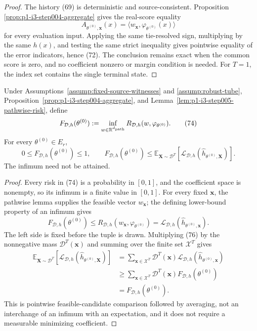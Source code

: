 \begin{proof}
The history (69) is deterministic and source-consistent.  Proposition
\ref{prop:p1-i3-step004-aggregate} gives the real-score equality
\[
A_{\theta^{(0)},\mathbf x}(x)
=\langle w_{\mathbf x},\varphi_{\theta^{(0)}}(x)\rangle
\tag{73}
\]
for every evaluation input.  Applying the same tie-resolved sign, multiplying
by the same $h(x)$, and testing the same strict inequality gives pointwise
equality of the error indicators, hence (72).  The conclusion remains exact
when the common score is zero, and no coefficient nonzero or margin condition
is needed.  For $T=1$, the index set contains the single terminal state.
\end{proof}

\begin{proposition}
\label{prop:p1-i3-step005-conditional-comparison}
Under Assumptions~\ref{assump:fixed-source-witnesses} and
\ref{assump:robust-tube}, Proposition~\ref{prop:p1-i3-step004-aggregate},
and Lemma~\ref{lem:p1-i3-step005-pathwise-risk}, define
\[
F_{\mathcal D,h}(\theta^{(0)}):=
\inf_{w\in\mathbb R^{d_{\rm path}}}
R_{\mathcal D,h}(w,\varphi_{\theta^{(0)}}).
\tag{74}
\]
For every $\theta^{(0)}\in E_r$,
\[
0\leq F_{\mathcal D,h}(\theta^{(0)})\leq1,
\qquad
F_{\mathcal D,h}(\theta^{(0)})
\leq\mathbb E_{\mathbf X\sim\mathcal D^T}
\left[\mathcal L_{\mathcal D,h}
(\widehat h_{\theta^{(0)},\mathbf X})\right].
\tag{75}
\]
The infimum need not be attained.
\end{proposition}

\begin{proof}
Every risk in (74) is a probability in $[0,1]$, and the coefficient space is
nonempty, so its infimum is a finite value in $[0,1]$.  For every fixed
$\mathbf x$, the pathwise lemma supplies the feasible vector $w_{\mathbf x}$;
the defining lower-bound property of an infimum gives
\[
F_{\mathcal D,h}(\theta^{(0)})
\leq R_{\mathcal D,h}(w_{\mathbf x},\varphi_{\theta^{(0)}})
=\mathcal L_{\mathcal D,h}
(\widehat h_{\theta^{(0)},\mathbf x}).
\tag{76}
\]
The left side is fixed before the tuple is drawn.  Multiplying (76) by the
nonnegative mass $\mathcal D^T(\mathbf x)$ and summing over the finite set
$\mathcal X^T$ gives
\[
\begin{aligned}
\mathbb E_{\mathbf X\sim\mathcal D^T}
\left[\mathcal L_{\mathcal D,h}
(\widehat h_{\theta^{(0)},\mathbf X})\right]
&=\sum_{\mathbf x\in\mathcal X^T}\mathcal D^T(\mathbf x)
\mathcal L_{\mathcal D,h}(\widehat h_{\theta^{(0)},\mathbf x})\\
&\geq\sum_{\mathbf x\in\mathcal X^T}\mathcal D^T(\mathbf x)
F_{\mathcal D,h}(\theta^{(0)})\\
&=F_{\mathcal D,h}(\theta^{(0)}).
\end{aligned}
\tag{77}
\]
This is pointwise feasible-candidate comparison followed by averaging, not an
interchange of an infimum with an expectation, and it does not require a
measurable minimizing coefficient.
\end{proof}


